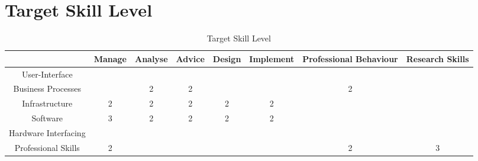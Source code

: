 
\section{Target Skill Level}
\label{sec:target}


\begin{table}[H]
	\centering
	\begin{tabular}{|c|c|c|c|c|c|c|c|}
		\hline
								& Manage 	& Analyse 	& Advice 	& Design 	& Implement 	& Professional Behaviour 	& Research Skills \\ \hline
		User-Interface 			& 			& 			& 			& 			& 	 			& 							& \\ \hline
		Business Processes 		& 			& 2			& 2 		& 			& 				& 2 						& \\ \hline
		Infrastructure 			& 2			& 2 		& 2			& 2 		& 2 			& 							& \\ \hline
		Software 				& 3 		& 2 		& 2 		& 2 		& 2 			& 							& \\ \hline
		Hardware Interfacing 	& 			& 			& 			& 			& 				& 							& \\ \hline
		Professional Skills 	& 2			& 			& 			& 			& 				& 2 						& 3 \\ \hline          
	\end{tabular}
	\caption{Target Skill Level}
	\label{targetskills}
\end{table}